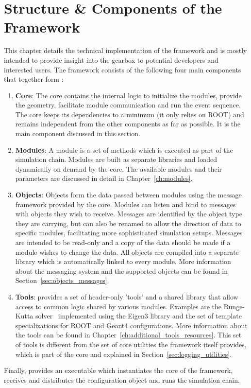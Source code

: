 \chapter{Structure \& Components of the Framework}
\label{ch:framework}

This chapter details the technical implementation of the \apsq framework and is mostly intended to provide insight into the gearbox to potential developers and interested users.
The framework consists of the following four main components that together form \apsq:
\begin{enumerate}
\item \textbf{Core}: The core contains the internal logic to initialize the modules, provide the geometry, facilitate module communication and run the event sequence.
The core keeps its dependencies to a minimum (it only relies on ROOT) and remains independent from the other components as far as possible.
It is the main component discussed in this section.
\item \textbf{Modules}: A module is a set of methods which is executed as part of the simulation chain.
Modules are built as separate libraries and loaded dynamically on demand by the core.
The available modules and their parameters are discussed in detail in Chapter~\ref{ch:modules}.
\item \textbf{Objects}: Objects form the data passed between modules using the message framework provided by the core.
Modules can listen and bind to messages with objects they wish to receive.
Messages are identified by the object type they are carrying, but can also be renamed to allow the direction of data to specific modules, facilitating more sophisticated simulation setups.
Messages are intended to be read-only and a copy of the data should be made if a module wishes to change the data.
All objects are compiled into a separate library which is automatically linked to every module.
More information about the messaging system and the supported objects can be found in Section~\ref{sec:objects_messages}.
\item \textbf{Tools}: \apsq provides a set of header-only 'tools' and a shared library that allow access to common logic shared by various modules.
Examples are the Runge-Kutta solver~\cite{fehlberg} implemented using the Eigen3 library and the set of template specializations for ROOT and Geant4 configurations.
More information about the tools can be found in Chapter~\ref{ch:additional_tools_resources}.
This set of tools is different from the set of core utilities the framework itself provides, which is part of the core and explained in Section~\ref{sec:logging_utilities}.
\end{enumerate}
Finally, \apsq provides an executable which instantiates the core of the framework, receives and distributes the configuration object and runs the simulation chain.

